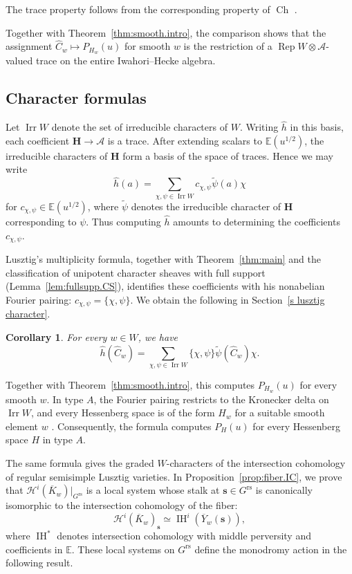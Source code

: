 \documentclass[11pt]{amsart}
\numberwithin{equation}{section}
\newtheorem{corollary}[theorem]{Corollary}
\theoremstyle{definition}
\newcommand\hecke{\mathbf{H}}  %
\DeclareMathOperator{\Irr}{\mathrm{Irr}}
\DeclareMathOperator{\Rep}{\mathrm{Rep}}
\def\cA{\mathcal {A}}
\def\EE{\mathbb{E}}
\def\Grs{G^{\mathrm{rs}}}
\DeclareMathOperator{\IH}{\mathrm{IH}}
\DeclareMathOperator{\Ch}{\mathrm{Ch}}
\begin{document}
The trace property follows from the corresponding property of $\Ch$ \cite[Lemma~2.7.1]{trinh2021heckecategoryunipotentlocus}.

Together with Theorem~\ref{thm:smooth.intro}, the comparison shows that the assignment $\widehat C_w\mapsto P_{H_w}(u)$ for smooth $w$ is the restriction of a $\Rep W\otimes\cA$-valued trace on the entire Iwahori--Hecke algebra.

\subsection{Character formulas}

Let $\Irr W$ denote the set of irreducible characters of $W$.
Writing $\widehat h$ in this basis, 
each coefficient $\hecke\to\cA$ is a trace.
After extending scalars to $\EE(u^{1/2})$, the irreducible
characters of $\hecke$ form a basis of the space of traces.
Hence we may write
\[
 \widehat h(a)=\sum_{\chi,\psi\in\Irr W}
 c_{\chi,\psi}\widetilde\psi(a)\chi
\]
for $c_{\chi,\psi}\in\EE(u^{1/2})$,
where $\widetilde\psi$ denotes the irreducible character of
$\hecke$ corresponding to $\psi$. Thus computing
$\widehat h$ amounts to determining the coefficients
$c_{\chi,\psi}$.

Lusztig's multiplicity formula, together with Theorem~\ref{thm:main} and the classification of unipotent character sheaves with full support (Lemma~\ref{lem:fullsupp.CS}), identifies these coefficients with his nonabelian Fourier pairing:
$c_{\chi,\psi}=\{\chi,\psi\}$.
We obtain the following in Section~\ref{s lusztig character}.
\begin{corollary}\label{cor:hess.formula}
For every $w\in W$, we have
\[
\widehat h(\widehat C_w)
=\sum_{\chi,\psi\in\Irr W}
	\{\chi,\psi\}\widetilde\psi(\widehat C_w)\chi.
\]
\end{corollary}
Together with Theorem~\ref{thm:smooth.intro}, this computes $P_{H_w}(u)$ for every smooth $w$.
In type $A$, the Fourier pairing restricts to the Kronecker delta on $\Irr W$, and every Hessenberg space is of the form $H_w$ for a suitable smooth element $w$ \cite[Proposition~3.1]{haiman}.
Consequently, the formula computes $P_H(u)$ for every Hessenberg space $H$ in type $A$.

The same formula gives the graded $W$-characters of the intersection cohomology of regular semisimple Lusztig varieties.
In Proposition~\ref{prop:fiber.IC}, we prove that $\mathcal H^i(\overline K_w)|_{\Grs}$ is a local system whose stalk at $\mathbf s\in\Grs$ is canonically 
isomorphic to the intersection cohomology of the fiber:
\begin{equation}\label{eq:stalk}
 \mathcal H^i(\overline K_w)_{\mathbf s}
 \simeq \IH^i(\overline Y_w(\mathbf s)),
\end{equation}
where $\IH^*$ denotes intersection cohomology with middle perversity and coefficients in $\EE$.
These local systems on $\Grs$ define the monodromy action in the following result.
\end{document}
